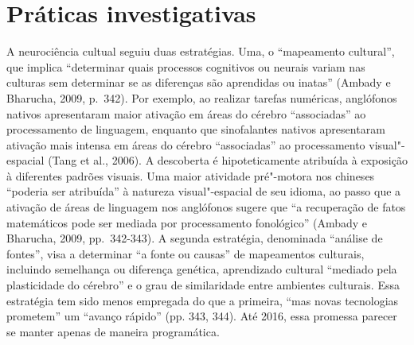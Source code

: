 \section{Práticas investigativas}

A neurociência cultual seguiu duas estratégias. Uma, o ``mapeamento
cultural'', que implica ``determinar quais processos cognitivos ou
neurais variam nas culturas sem determinar se as diferenças são
aprendidas ou inatas'' (Ambady e Bharucha, 2009, p.~342). Por exemplo, ao
realizar tarefas numéricas, anglófonos nativos apresentaram maior
ativação em áreas do cérebro ``associadas'' ao processamento de
linguagem, enquanto que sinofalantes nativos apresentaram ativação mais
intensa em áreas do cérebro ``associadas'' ao processamento
visual"-espacial (Tang et al., 2006). A descoberta é hipoteticamente
atribuída à exposição à diferentes padrões visuais. Uma maior atividade
pré"-motora nos chineses ``poderia ser atribuída'' à natureza
visual"-espacial de seu idioma, ao passo que a ativação de áreas de
linguagem nos anglófonos sugere que ``a recuperação de fatos
matemáticos pode ser mediada por processamento fonológico'' (Ambady e
Bharucha, 2009, pp.~342-343). A segunda estratégia, denominada ``análise
de fontes'', visa a determinar ``a fonte ou causas'' de mapeamentos
culturais, incluindo semelhança ou diferença genética, aprendizado
cultural ``mediado pela plasticidade do cérebro'' e o grau de
similaridade entre ambientes culturais. Essa estratégia tem sido menos
empregada do que a primeira, ``mas novas tecnologias prometem'' um
``avanço rápido'' (pp. 343, 344). Até 2016, essa promessa parecer se
manter apenas de maneira programática.

